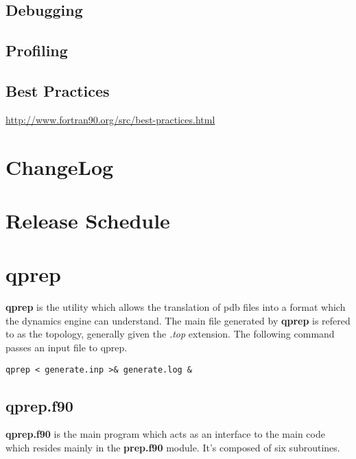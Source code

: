 \documentclass[10pt, oneside, pdftex]{article}
\begin{document}
\subsection{Debugging}
\label{debugging}


\subsection{Profiling}
\label{profiling}

\subsection{Best Practices}
\label{bestpractices}

\url{http://www.fortran90.org/src/best-practices.html}


\section{ChangeLog}
\label{changelog}


\section{Release Schedule}
\label{schedule}


\section{qprep}
\label{qprep}
\textbf{qprep}  is the  utility which  allows the  translation of  pdb
files into a format which the dynamics engine can understand. The main
file  generated  by \textbf{qprep}  is  refered  to as  the  topology,
generally  given the  \textit{.top} extension.  The following  command
passes an input file to qprep.

\lstset{language=sh, frame=single}
\begin{Verbatim}
qprep < generate.inp >& generate.log &
\end{Verbatim}

\subsection{qprep.f90}

\textbf{qprep.f90} is the  main program which acts as  an interface to
the main  code which resides  mainly in the  \textbf{prep.f90} module.
It's composed of six subroutines.\\
\end{document}
